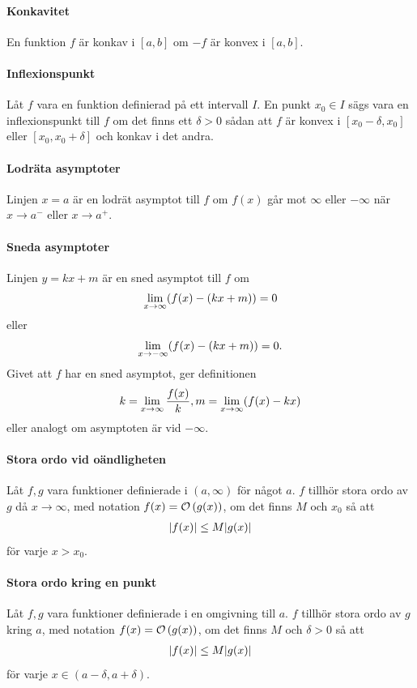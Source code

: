 \paragraph{Konkavitet}
En funktion $f$ är konkav  i $[a, b]$ om $-f$ är konvex i $[a, b]$.

\paragraph{Inflexionspunkt}
Låt $f$ vara en funktion definierad på ett intervall $I$. En punkt $x_0\in I$ sägs vara en inflexionspunkt till $f$ om det finns ett $\delta > 0$ sådan att $f$ är konvex i $[x_0 - \delta, x_0]$ eller $[x_0, x_0 + \delta]$ och konkav i det andra.

\paragraph{Lodräta asymptoter}
Linjen $x = a$ är en lodrät asymptot till $f$ om $f(x)$ går mot $\infty$ eller $-\infty$ när $x\to a^{-}$ eller $x\to a^{+}$.

\paragraph{Sneda asymptoter}
Linjen $y = kx + m$ är en sned asymptot till $f$ om
\begin{align*}
	\lim\limits_{x\to \infty}(f(x) - (kx + m)) = 0
\end{align*}
eller
\begin{align*}
	\lim\limits_{x\to -\infty}(f(x) - (kx + m)) = 0.
\end{align*}
Givet att $f$ har en sned asymptot, ger definitionen
\begin{align*}
	k = \lim\limits_{x\to \infty}\frac{f(x)}{k}, m = \lim\limits_{x\to \infty}(f(x) - kx)
\end{align*}
eller analogt om asymptoten är vid $-\infty$.

\paragraph{Stora ordo vid oändligheten}
Låt $f, g$ vara funktioner definierade i $(a, \infty)$ för något $a$. $f$ tillhör stora ordo av $g$ då $x\to\infty$, med notation $f(x) = \mathcal{O}\left(g(x)\right)$, om det finns $M$ och $x_0$ så att
\begin{align*}
	\abs{f(x)}\leq M\abs{g(x)}
\end{align*}
för varje $x > x_0$.

\paragraph{Stora ordo kring en punkt}
Låt $f, g$ vara funktioner definierade i en omgivning till $a$. $f$ tillhör stora ordo av $g$ kring $a$, med notation $f(x) = \mathcal{O}\left(g(x)\right)$, om det finns $M$ och $\delta > 0$ så att
\begin{align*}
	\abs{f(x)}\leq M\abs{g(x)}
\end{align*}
för varje $x\in(a - \delta, a + \delta)$.

